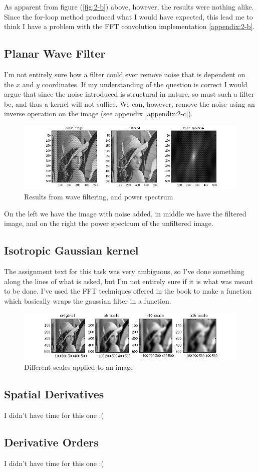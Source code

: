 As apparent from figure (\ref{fig:2-b}) above, however, the results were
nothing alike. Since the for-loop method produced what I would have expected,
this lead me to think I have a problem with the FFT convolution
implementation \ref{appendix:2-b}.

\subsection{Planar Wave Filter}
I'm not entirely sure how a filter could ever remove noise that is dependent
on the $x$ and $y$ coordinates. If my understanding of the question is correct
I would argue that since the noise introduced is structural in nature, so
must such a filter be, and thus a kernel will not suffice. We can, however,
remove the noise using an inverse operation on the image (see appendix
\ref{appendix:2-c}).

\begin{figure}[H]
    \center
    \includegraphics[scale=0.5]{figures/2-c}
    \caption{Results from wave filtering, and power spectrum}
    \label{fig:2-c}
\end{figure}

On the left we have the image with noise added, in middle we have the filtered
image, and on the right the power spectrum of the unfiltered image.

\subsection{Isotropic Gaussian kernel}
The assignment text for this task was very ambiguous, so I've done something
along the lines of what is asked, but I'm not entirely sure if it is what was
meant to be done. I've used the FFT techniques offered in the book to make a
function which basically wraps the gaussian filter in a function.

\begin{figure}[H]
    \center
    \includegraphics[scale=0.75]{figures/2-d}
    \caption{Different scales applied to an image}
    \label{fig:2-d}
\end{figure}

\subsection{Spatial Derivatives}
I didn't have time for this one :(

\subsection{Derivative Orders}
I didn't have time for this one :(
